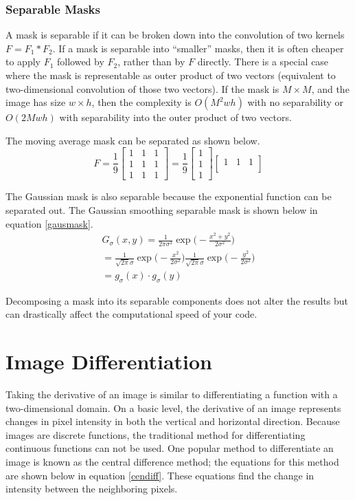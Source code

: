 \documentclass[twoside]{article}
\begin{document}
\subsubsection{Separable Masks}
A mask is separable if it can be broken down into the convolution of two kernels $F = F_1 * F_2$. If a mask is separable into ``smaller'' masks, then it is often cheaper to apply $F_1$ followed by $F_2$, rather than by $F$ directly. There is a special case where the mask is representable as outer product of two vectors (equivalent to two-dimensional convolution of those two vectors). If the mask is $M\times M$, and the image has size $w\times h$, then the complexity is $O(M^2wh)$ with no separability or $O(2Mwh)$ with separability into the outer product of two vectors.

The moving average mask can be separated as shown below.
\[
F = \frac{1}{9}
\begin{bmatrix}
1 & 1 & 1\\
1 & 1 & 1\\
1 & 1 & 1
\end{bmatrix} = \frac{1}{9}
\begin{bmatrix}
1 \\
1 \\
1 
\end{bmatrix}
\begin{bmatrix}
1 & 1 & 1\\
\end{bmatrix}
\]

The Gaussian mask is also separable because the exponential function can be separated out. The Gaussian smoothing separable mask is shown below in equation \ref{gausmask}.
\begin{equation}
\label{gausmask}
  \begin{aligned}
  	G_\sigma(x,y) = \frac{1}{2\pi\sigma^2} \exp \bigg(-\frac{x^2 + y^2}{2\sigma^2} \bigg)\\
    = \frac{1}{\sqrt{2\pi}\sigma}\exp \bigg(-\frac{x^2}{2\sigma^2}\bigg)\frac{1}{\sqrt{2\pi}\sigma} \exp \bigg(-\frac{y^2}{2\sigma^2}\bigg) \\
    = g_\sigma(x) \cdot g_\sigma(y)
  \end{aligned}
\end{equation}

Decomposing a mask into its separable components does not alter the results but can drastically affect the computational speed of your code.

\section{Image Differentiation}
Taking the derivative of an image is similar to differentiating a function with a two-dimensional domain. On a basic level, the derivative of an image represents changes in pixel intensity in both the vertical and horizontal direction. Because images are discrete functions, the traditional method for differentiating continuous functions can not be used. One popular method to differentiate an image is known as the central difference method; the equations for this method are shown below in equation \ref{cendiff}. These equations find the change in intensity between the neighboring pixels.
\end{document}

